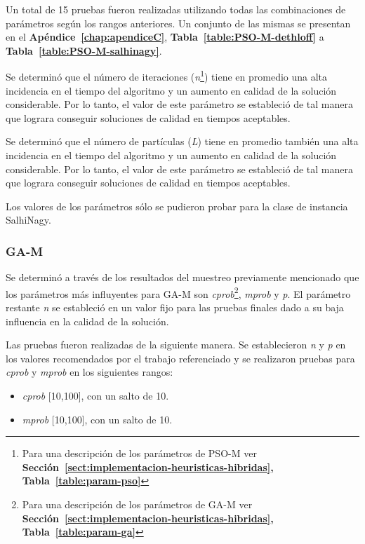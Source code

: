 Un total de 15 pruebas fueron realizadas utilizando todas las combinaciones de parámetros según los rangos anteriores. Un conjunto de las mismas se presentan en el \textbf{Apéndice~\ref{chap:apendiceC}}, \textbf{Tabla~\ref{table:PSO-M-dethloff}} a \textbf{Tabla~\ref{table:PSO-M-salhinagy}}.

Se determinó que el número de iteraciones (\emph{n}\footnote{Para una descripción de los parámetros de PSO-M ver \textbf{Sección~\ref{sect:implementacion-heuristicas-hibridas}, Tabla~\ref{table:param-pso}}}) tiene en promedio una alta incidencia en el tiempo del algoritmo y un aumento en calidad de la solución considerable. Por lo tanto, el valor de este parámetro se estableció de tal manera que lograra conseguir soluciones de calidad en tiempos aceptables.

Se determinó que el número de partículas (\emph{L}) tiene en promedio también una alta incidencia en el tiempo del algoritmo y un aumento en calidad de la solución considerable. Por lo tanto, el valor de este parámetro se estableció de tal manera que lograra conseguir soluciones de calidad en tiempos aceptables.

Los valores de los parámetros sólo se pudieron probar para la clase de instancia SalhiNagy.\\

\subsubsection*{GA-M} 

Se determinó a través de los resultados del muestreo previamente mencionado que los parámetros más influyentes para GA-M son \emph{cprob}\footnote{Para una descripción de los parámetros de GA-M ver \textbf{Sección~\ref{sect:implementacion-heuristicas-hibridas}, Tabla~\ref{table:param-ga}}}, \emph{mprob} y \emph{p}. El parámetro restante \emph{n} se estableció en un valor fijo para las pruebas finales dado a su baja influencia en la calidad de la solución.

Las pruebas fueron realizadas de la siguiente manera. Se establecieron \emph{n} y \emph{p} en los valores recomendados por el trabajo referenciado y se realizaron pruebas para \emph{cprob} y \emph{mprob} en los siguientes rangos:

\begin{itemize}
\item \emph{cprob} [10,100], con un salto de 10.
\item \emph{mprob} [10,100], con un salto de 10.
\end{itemize}

